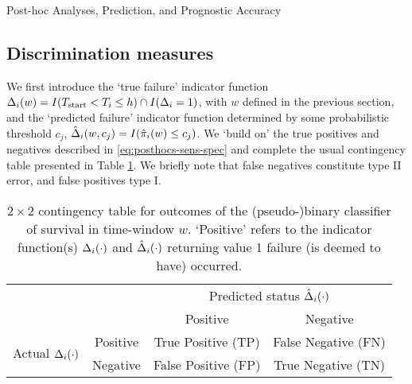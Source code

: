 \begin{chapter}{\label{cha:posthoc}Post-hoc Analyses, Prediction, and Prognostic Accuracy}
\subsection{Discrimination measures}\label{sec:posthoc-prognostics-ROC}
We first introduce the `true failure' indicator function $\Delta_i\!\left( w\right)=I\!\left( T_{\mathrm{start}}<T_i\le h\right)\cap I\!\left(\Delta_i=1\right)$, with $w$ defined in the previous section, and the `predicted failure' indicator function determined by some probabilistic threshold $c_j$, $\hat{\Delta}_i\!\left( w,c_j\right)=I\!\left(\hat{\pi}_i\!\left( w\right)\le c_j\right)$. We `build on' the true positives and negatives described in \eqref{eq:posthocs-sens-spec} and complete the usual contingency table presented in Table \ref{tab:posthocs-ROC}. We briefly note that false negatives constitute type II error, and false positives type I.
\begin{table}[h]
    \centering
    \begin{tabular}{cc|c|c|}
        \multicolumn{2}{c}{} & \multicolumn{2}{c}{Predicted status $\hat{\Delta}_i\!\left(\cdot\right)$} \\
        \cline{3-4}
        \multicolumn{2}{c|}{} & Positive & Negative \\
        \cline{2-4}
        \multirow{2}{*}{Actual $\Delta_i\!\left(\cdot\right)$} & Positive & True Positive (TP) & False Negative (FN) \\
        \cline{2-4}
        & Negative & False Positive (FP) & True Negative (TN) \\
        \cline{2-4}
    \end{tabular}
    \caption{$2\times2$ contingency table for outcomes of the (pseudo-)binary classifier of survival in time-window $w$. `Positive' refers to the indicator function(s) $\Delta_i\!\left(\cdot\right)$ and $\hat{\Delta}_i\!\left(\cdot\right)$ returning value 1 \ie failure (is deemed to have) occurred.}
    \label{tab:posthocs-ROC}
\end{table}


\end{chapter}
